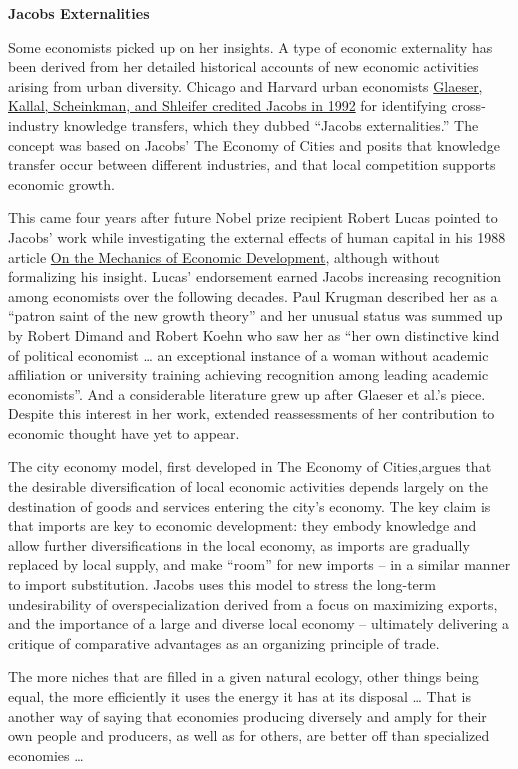 \documentclass[
]{book}
\begin{document}
\textbf{Jacobs Externalities}

Some economists picked up on her insights. A type of economic externality has been derived from her detailed historical accounts of new economic activities arising from urban diversity. Chicago and Harvard urban economists \href{https://www.nber.org/papers/w3787}{Glaeser, Kallal, Scheinkman, and Shleifer credited Jacobs in 1992} for identifying cross-industry knowledge transfers, which they dubbed ``Jacobs externalities.''
The concept was based on Jacobs' The Economy of Cities and posits that knowledge transfer occur between different industries, and that local competition supports economic growth.

This came four years after future Nobel prize recipient Robert Lucas pointed to Jacobs' work while investigating the external effects of human capital in his 1988 article
\href{https://www.sciencedirect.com/science/article/abs/pii/0304393288901687}{On the Mechanics of Economic Development},
although without formalizing his insight.
Lucas' endorsement earned Jacobs increasing recognition among economists over the following decades.
Paul Krugman described her as a ``patron saint of the new growth theory'' and her unusual status
was summed up by Robert Dimand and Robert Koehn who saw her as
``her own distinctive kind of political economist \ldots{}
an exceptional instance of a woman without academic affiliation or university training
achieving recognition among leading academic economists''.
And a considerable literature grew up after Glaeser et al.'s piece.
Despite this interest in her work, extended reassessments of her contribution
to economic thought have yet to appear.

The city economy model, first developed in The Economy of Cities,argues that the desirable diversification of local economic activities depends largely on the destination of goods and services entering the city's economy. The key claim is that imports are key to economic development: they embody knowledge and allow further diversifications in the local economy, as imports are gradually replaced by local supply, and make ``room'' for new imports -- in a similar manner to import substitution. Jacobs uses this model to stress the long-term undesirability of overspecialization derived from a focus on maximizing exports, and the importance of a large and diverse local economy -- ultimately delivering a critique of comparative advantages as an organizing principle of trade.

The more niches that are filled in a given natural ecology, other things being equal,
the more efficiently it uses the energy it has at its disposal \ldots{}
That is another way of saying that economies producing diversely and amply
for their own people and producers, as well as for others,
are better off than specialized economies \ldots{}
\end{document}
